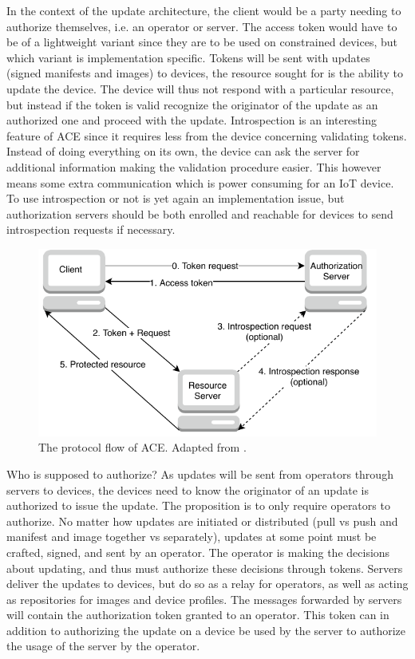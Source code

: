 \documentclass[0-thesis.tex]{subfiles}
\begin{document}
In the context of the update architecture, the client would be a party needing to
authorize themselves, i.e. an operator or server. The access token would have to be of a
lightweight variant since they are to be used on constrained devices, but which variant is
implementation specific. Tokens will be sent with updates (signed manifests and images) to
devices, the resource sought for is the ability to update the device. The device will thus
not respond with a particular resource, but instead if the token is valid recognize the
originator of the update as an authorized one and proceed with the update. Introspection
is an interesting feature of ACE since it requires less from the device concerning
validating tokens. Instead of doing everything on its own, the device can ask the server
for additional information making the validation procedure easier. This however means some
extra communication which is power consuming for an IoT device. To use introspection or
not is yet again an implementation issue, but authorization servers should be both
enrolled and reachable for devices to send introspection requests if necessary.

\begin{figure}
    \caption{The protocol flow of ACE. Adapted from \parencite{ace}.}
    \label{fig:ace-flow}
    \includegraphics{images/ace.pdf}
\end{figure}

Who is supposed to authorize? As updates will be sent from operators through servers to
devices, the devices need to know the originator of an update is authorized to issue the
update. The proposition is to only require operators to authorize. No matter how updates
are initiated or distributed (pull vs push and manifest and image together vs separately),
updates at some point must be crafted, signed, and sent by an operator. The operator is
making the decisions about updating, and thus must authorize these decisions through
tokens. Servers deliver the updates to devices, but do so as a relay for operators, as
well as acting as repositories for images and device profiles. The messages forwarded by
servers will contain the authorization token granted to an operator. This token can in
addition to authorizing the update on a device be used by the server to authorize the
usage of the server by the operator. 
\end{document}
